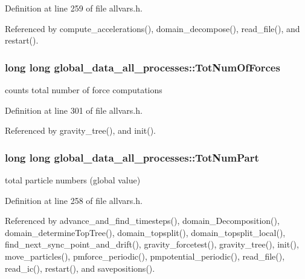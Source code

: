 Definition at line 259 of file allvars.h.



Referenced by compute\_\-accelerations(), domain\_\-decompose(), read\_\-file(), and restart().

\hypertarget{structglobal__data__all__processes_a44181b6f6375de86c7dda1059d2fc3f4}{
\subsubsection[{TotNumOfForces}]{\setlength{\rightskip}{0pt plus 5cm}long long {\bf global\_\-data\_\-all\_\-processes::TotNumOfForces}}}
\label{structglobal__data__all__processes_a44181b6f6375de86c7dda1059d2fc3f4}
counts total number of force computations 

Definition at line 301 of file allvars.h.



Referenced by gravity\_\-tree(), and init().

\hypertarget{structglobal__data__all__processes_a853bbd3ea833c0a6a57af1434b611868}{
\subsubsection[{TotNumPart}]{\setlength{\rightskip}{0pt plus 5cm}long long {\bf global\_\-data\_\-all\_\-processes::TotNumPart}}}
\label{structglobal__data__all__processes_a853bbd3ea833c0a6a57af1434b611868}
total particle numbers (global value) 

Definition at line 258 of file allvars.h.



Referenced by advance\_\-and\_\-find\_\-timesteps(), domain\_\-Decomposition(), domain\_\-determineTopTree(), domain\_\-topsplit(), domain\_\-topsplit\_\-local(), find\_\-next\_\-sync\_\-point\_\-and\_\-drift(), gravity\_\-forcetest(), gravity\_\-tree(), init(), move\_\-particles(), pmforce\_\-periodic(), pmpotential\_\-periodic(), read\_\-file(), read\_\-ic(), restart(), and savepositions().

